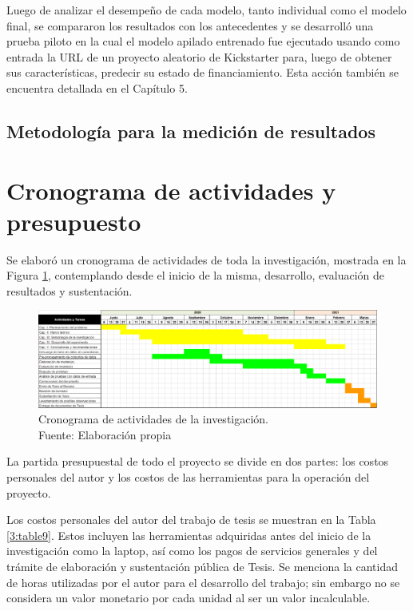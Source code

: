 Luego de analizar el desempeño de cada modelo, tanto individual como el modelo final, se compararon los resultados con los antecedentes y se desarrolló una prueba piloto en la cual el modelo apilado entrenado fue ejecutado usando como entrada la URL de un proyecto aleatorio de Kickstarter para, luego de obtener sus características, predecir su estado de financiamiento. Esta acción también se encuentra detallada en el Capítulo 5.

\subsection{Metodología para la medición de resultados}

\section{Cronograma de actividades y presupuesto}
Se elaboró un cronograma de actividades de toda la investigación, mostrada en la Figura \ref{3:fig8}, contemplando desde el inicio de la misma, desarrollo, evaluación de resultados y sustentación.
\begin{figure}[h]
	\begin{center}
		\includegraphics[width=1.1\textwidth]{3/figures/cronograma.png}
		\caption[Cronograma de actividades de la investigación]{Cronograma de actividades de la investigación.\\
		Fuente: Elaboración propia}
		\label{3:fig8}
	\end{center}
\end{figure}

La partida presupuestal de todo el proyecto se divide en dos partes: los costos personales del autor y los costos de las herramientas para la operación del proyecto.

Los costos personales del autor del trabajo de tesis se muestran en la Tabla \ref{3:table9}. Estos incluyen las herramientas adquiridas antes del inicio de la investigación como la laptop, así como los pagos de servicios generales y del trámite de elaboración y sustentación pública de Tesis. Se menciona la cantidad de horas utilizadas por el autor para el desarrollo del trabajo; sin embargo no se considera un valor monetario por cada unidad al ser un valor incalculable.

